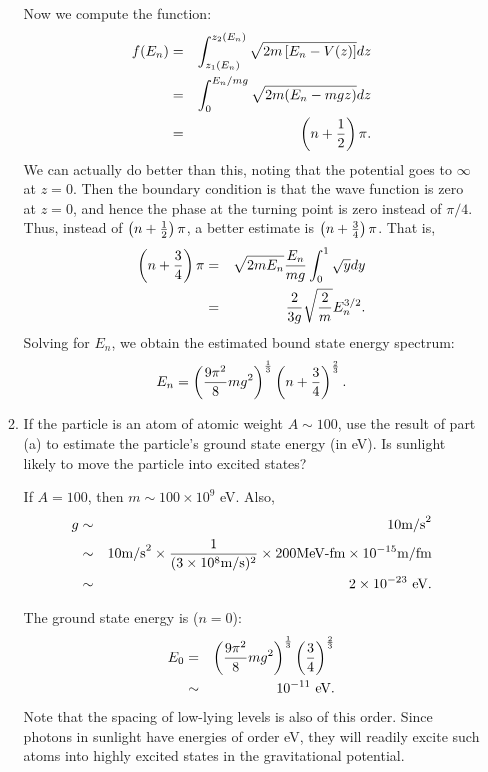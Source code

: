 \begin{enumerate}
\begin{enumerate}
Now we compute the function:
\begin{eqnarray}
 f(E_n) &=& \int_{z_1(E_n)}^{z_2(E_n)} \sqrt{2m\left[E_n-V(z)\right]} dz \\
  &=& \int_0^{E_n/mg} \sqrt{2m(E_n-mgz)} dz \\
  &=& \left(n+{1\over 2}\right)\pi.
\end{eqnarray}
We can actually do better than this, noting that the potential goes to $\infty$ at $z=0$. Then the boundary condition is that the wave function is zero at $z=0$, and hence the phase at the turning point is zero instead of $\pi/4$. Thus, instead of $\left(n+{1\over 2}\right)\pi$, a better estimate is $\left(n+{3\over 4}\right)\pi$.
That is,
\begin{eqnarray}
 \left(n+{3\over 4}\right)\pi &=& \sqrt{2mE_n}{E_n\over mg}\int_0^1 \sqrt{y}dy \\
  &=& {2\over 3g}\sqrt{{2\over m}} E_n^{3/2}.
\end{eqnarray}
Solving for $E_n$, we obtain the estimated bound state energy spectrum:
\begin{equation}
 E_n = \left({9\pi^2\over 8}mg^2\right)^{{1\over 3}} \left(n+{3\over 4}\right)^{{2\over 3}}.
\end{equation}
 
\fi

\item If the particle is an atom of atomic weight $A\sim 100$, use the
result of part (a) to estimate the particle's ground state energy 
(in eV). 
Is sunlight likely to move the particle into excited states?

\ifsolve {} 
If $A=100$, then $m\sim 100\times 10^9$ eV. Also,
\begin{eqnarray}
 g &\sim& 10 \hbox{m/s}^2 \\
  &\sim& 10 \hbox{m/s}^2 \times {1\over (3\times10^8 \hbox{m/s})^2} \times 200 \hbox{MeV-fm} \times 10^{-15} \hbox{m/fm} \nonumber \\
  &\sim& 2\times 10^{-23}\ \hbox{eV}.
\end{eqnarray}

The ground state energy is ($n=0$):
\begin{eqnarray}
 E_0 &=& \left({9\pi^2\over 8}mg^2\right)^{{1\over 3}} \left({3\over 4}\right)^{{2\over 3}} \\
  &\sim& 10^{-11}\ \hbox{eV}.
\end{eqnarray}
Note that the spacing of low-lying levels is also of this order. 
Since photons in sunlight have energies of order eV, they will readily excite such atoms into highly excited states in the gravitational potential.
 

\end{enumerate}
\end{enumerate}
